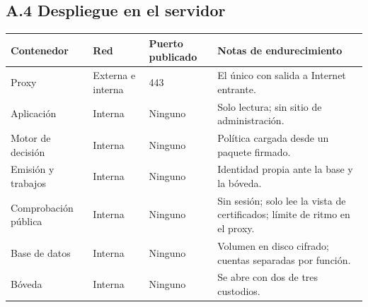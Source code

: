 \documentclass[11pt,letterpaper]{article}
\newcommand{\cab}[1]{\textbf{\rmfamily #1}}
\begin{document}
\begin{center}
\end{center}

\subsection*{A.4 Despliegue en el servidor}

\begin{center}
\small
\renewcommand{\arraystretch}{1.22}
\begin{tabularx}{\textwidth}{@{}L{3.0cm} L{3.0cm} L{3.3cm} Y@{}}
\toprule
\cab{Contenedor} & \cab{Red} & \cab{Puerto publicado} & \cab{Notas de endurecimiento} \\
\midrule
Proxy & Externa e interna & 443 & El único con salida a Internet entrante. \\
Aplicación & Interna & Ninguno & Solo lectura; sin sitio de administración. \\
Motor de decisión & Interna & Ninguno & Política cargada desde un paquete firmado. \\
Emisión y trabajos & Interna & Ninguno & Identidad propia ante la base y la bóveda. \\
Comprobación pública & Interna & Ninguno & Sin sesión; solo lee la vista de certificados; límite de ritmo en el proxy. \\
Base de datos & Interna & Ninguno & Volumen en disco cifrado; cuentas separadas por función. \\
Bóveda & Interna & Ninguno & Se abre con dos de tres custodios. \\
\bottomrule
\end{tabularx}
\end{center}
\end{document}
